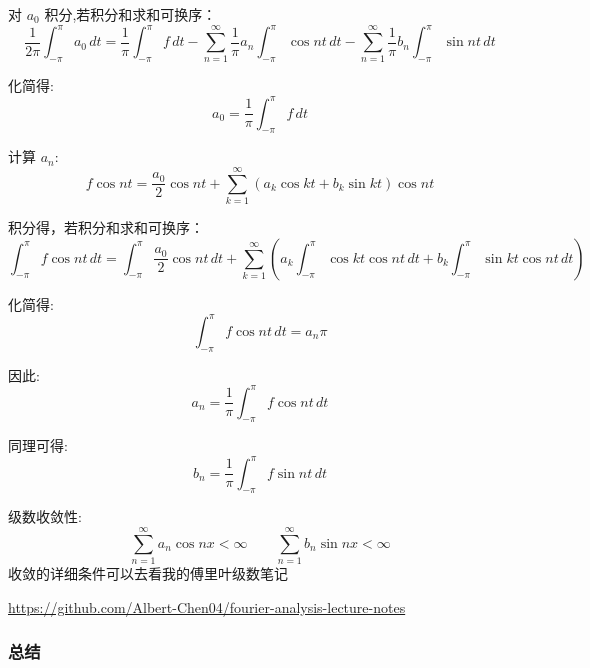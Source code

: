 \documentclass[12pt,a4paper]{article}
\numberwithin{subsection}{section}   %
\numberwithin{subsubsection}{subsection}
\theoremstyle{plain}
\theoremstyle{definition}
\theoremstyle{remark}
\theoremstyle{remark}
\begin{document}
	对 \( a_0 \) 积分,若积分和求和可换序：
	\begin{equation}
		\frac{1}{2\pi} \int_{-\pi}^{\pi} a_0 \, dt = \frac{1}{\pi} \int_{-\pi}^{\pi} f \, dt - \sum_{n=1}^{\infty} \frac{1}{\pi} a_n \int_{-\pi}^{\pi} \cos nt \, dt - \sum_{n=1}^{\infty} \frac{1}{\pi} b_n \int_{-\pi}^{\pi} \sin nt \, dt
	\end{equation}
	
	化简得:
	\begin{equation}
		a_0 = \frac{1}{\pi} \int_{-\pi}^{\pi} f \, dt
	\end{equation}
	
	计算 \( a_n \):
	\begin{equation}
		f \cos nt = \frac{a_0}{2} \cos nt + \sum_{k=1}^{\infty} \left( a_k \cos kt + b_k \sin kt \right) \cos nt
	\end{equation}
	
	积分得，若积分和求和可换序：
	\begin{equation}
		\int_{-\pi}^{\pi} f \cos nt \, dt = \int_{-\pi}^{\pi} \frac{a_0}{2} \cos nt \, dt + \sum_{k=1}^{\infty} \left( a_k \int_{-\pi}^{\pi} \cos kt \cos nt \, dt + b_k \int_{-\pi}^{\pi} \sin kt \cos nt \, dt \right)
	\end{equation}
	
	化简得:
	\begin{equation}
		\int_{-\pi}^{\pi} f \cos nt \, dt = a_n \pi
	\end{equation}
	
	因此:
	\begin{equation}
		a_n = \frac{1}{\pi} \int_{-\pi}^{\pi} f \cos nt \, dt
	\end{equation}
	
	同理可得:
	\begin{equation}
		b_n = \frac{1}{\pi} \int_{-\pi}^{\pi} f \sin nt \, dt
	\end{equation}
	
	级数收敛性:
	\begin{equation}
		\sum_{n=1}^{\infty} a_n \cos nx < \infty \qquad \sum_{n=1}^{\infty} b_n \sin nx < \infty
	\end{equation}
	收敛的详细条件可以去看我的傅里叶级数笔记
	
	\url{https://github.com/Albert-Chen04/fourier-analysis-lecture-notes}
	
	\subsubsection{总结}
	
\end{document}
